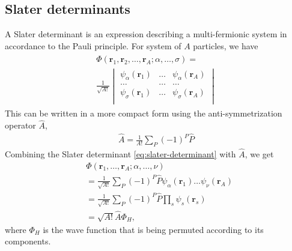 \documentclass[11pt]{article}
\begin{document}
\subsection{Slater determinants}
A Slater determinant is an expression describing a multi-fermionic system in accordance to the Pauli principle. For system of $A$ particles, we have 
\begin{align}
	\begin{split}
		\Phi(\mathbf{r}_1,\mathbf{r}_2,\dots,\mathbf{r}_A; \alpha,\dots,\sigma) =\\
		\frac{1}{\sqrt{A!}}
		\begin{vmatrix}
			\psi_\alpha(\mathbf{r}_1) & \dots & \psi_\alpha(\mathbf{r}_A) \\
			\dots & \dots & \dots \\
			\psi_\sigma(\mathbf{r}_1) & \dots & \psi_\sigma(\mathbf{r}_A) \\
		\end{vmatrix}
	\end{split}
	\label{eq:slater-determinant}
\end{align}
This can be written in a more compact form using the anti-symmetrization operator $\hat{A}$,
\begin{align}
	\hat{A} = \frac{1}{A!}\sum_P (-1)^P \hat{P}
	\label{eq:anti-symmetrization-operator}
\end{align}
Combining the Slater determinant \eqref{eq:slater-determinant} with $\hat{A}$, we get
\begin{align}
	&\Phi(\mathbf{r}_1,\dots,\mathbf{r}_A;\alpha,\dots,\nu) \nonumber \\
	&= \frac{1}{\sqrt{A!}}\sum_P (-1)^P \hat{P}\psi_\alpha(\mathbf{r}_1)\dots\psi_\nu(\mathbf{r}_A) \nonumber \\
	&= \frac{1}{\sqrt{A!}}\sum_P (-1)^P \hat{P} \prod_s \psi_s(\mathbf{r}_s) \nonumber \\
	&= \sqrt{A!}\hat{A}\Phi_H,
	\label{eq:slater-determinant-compact}
\end{align}
where $\Phi_H$ is the wave function that is being permuted according to its components.
\end{document}
